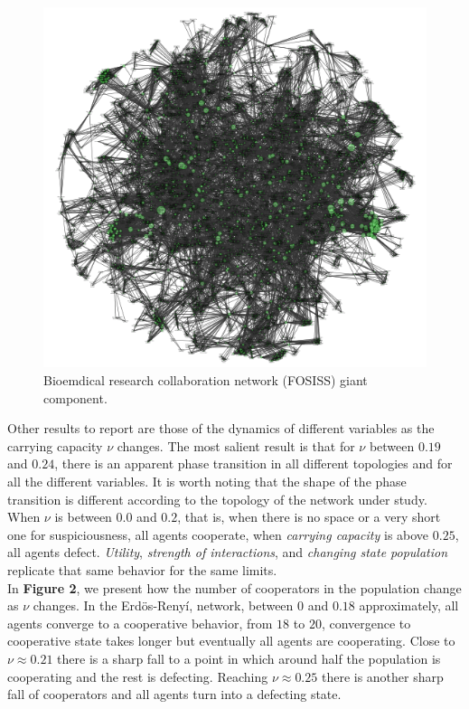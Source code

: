 \documentclass[11pt]{article}
\begin{document}
\begin{figure} [h!]
\centering
\includegraphics[scale=0.5]{images/Fosiss_GC_final.png}
\caption{Bioemdical research collaboration network (FOSISS) giant component.}\label{Fosiss_GC}
\end{figure}

\FloatBarrier

Other results to report are those of the dynamics of different
variables as the carrying capacity $\nu$ changes. The  most salient
result is that for $\nu$ between $0.19$ and $0.24$, there is an
apparent phase transition in all different topologies and for all the
different variables. It is worth noting that the shape
of the phase transition is different according to the topology of the
network under study. When $\nu$ is between $0.0$ and $0.2$, that is, when there is
no space or a very short one for suspiciousness, all agents cooperate, when
\textit{carrying capacity} is above $0.25$, all agents defect. \textit{Utility},
\textit{strength of interactions}, and \textit{changing state population}
replicate that same behavior for the same limits. \\ 

In \textbf{Figure 2}, we present how the number of cooperators in the population
change as $\nu$ changes. In the Erd\"{o}s-Reny\'i, network, between $0$ and
$0.18$ approximately, all agents converge to a cooperative behavior, from $18$
to $20$, convergence to cooperative state takes longer but eventually all agents
are cooperating. Close to $\nu \approx 0.21$ there is a sharp fall to a point in
which around half the population is cooperating and the rest is
defecting. Reaching $\nu \approx 0.25$ there is another sharp fall of
cooperators and all agents turn into a defecting state.\\
\end{document}
